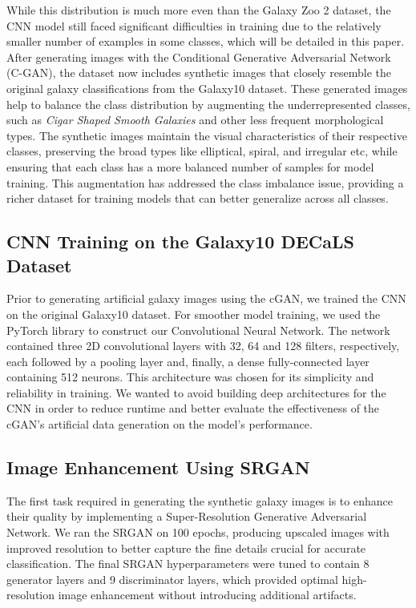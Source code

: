 \documentclass[10pt,twocolumn,letterpaper]{article}
\begin{document}
While this distribution is much more even than the Galaxy Zoo 2 dataset, the CNN model still faced significant difficulties in training due to the relatively smaller number of examples in some classes, which will be detailed in this paper.
After generating images with the Conditional Generative Adversarial Network (C-GAN), the dataset now includes synthetic images that closely resemble the original galaxy classifications from the Galaxy10 dataset. These generated images help to balance the class distribution by augmenting the underrepresented classes, such as \textit{Cigar Shaped Smooth Galaxies} and other less frequent morphological types. The synthetic images maintain the visual characteristics of their respective classes, preserving the broad types like elliptical, spiral, and irregular etc, while ensuring that each class has a more balanced number of samples for model training. This augmentation has addressed the class imbalance issue, providing a richer dataset for training models that can better generalize across all classes.



\subsection{CNN Training on the Galaxy10 DECaLS Dataset}
Prior to generating artificial galaxy images using the cGAN, we trained the CNN on the original Galaxy10 dataset.
For smoother model training, we used the PyTorch library to construct our Convolutional Neural Network.
The network contained three 2D convolutional layers with 32, 64 and 128 filters, respectively, each followed by a pooling layer and, finally, a dense fully-connected layer containing 512 neurons.
This architecture was chosen for its simplicity and reliability in training. 
We wanted to avoid building deep architectures for the CNN in order to reduce runtime and better evaluate the effectiveness of the cGAN's artificial data generation on the model's performance. 



\subsection{Image Enhancement Using SRGAN}
The first task required in generating the synthetic galaxy images is to enhance their quality by implementing a Super-Resolution Generative Adversarial Network.
We ran the SRGAN on 100 epochs, producing upscaled images with improved resolution to better capture the fine details crucial for accurate classification.
The final SRGAN hyperparameters were tuned to contain 8 generator layers and 9 discriminator layers, which provided optimal high-resolution image enhancement without introducing additional artifacts.
\end{document}
